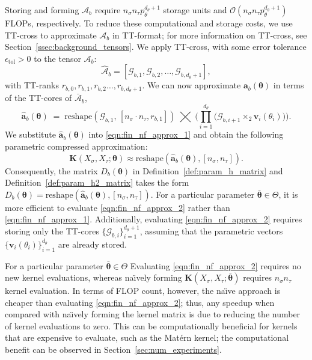 \documentclass[final,3p,times]{elsarticle}
\newcommand{\mc}[1]{\mathcal{#1}}
\renewcommand{\vec}[1]{\boldsymbol{#1}}
\newcommand{\vech}[1]{\widehat{\boldsymbol{#1}}}
\newcommand{\mat}[1]{\boldsymbol{#1}}
\newcommand{\ten}[1]{\boldsymbol{\mathcal{#1}}}
\newcommand{\tenh}[1]{\widehat{\boldsymbol{\mc{#1}}}}
\begin{document}
Storing and forming $\ten{A}_{b}$ require $n_{\sigma}n_{\tau}p_{\theta}^{d_{\theta}+1}$ storage units and  $\mathcal{O}(n_{\sigma}n_{\tau}p_{\theta}^{d_{\theta}+1})$ FLOPs, respectively.
To reduce these computational and storage costs, we use TT-cross to approximate $\ten{A}_{b}$ in TT-format; for more information on TT-cross, see Section~\ref{ssec:background_tensors}.  We apply TT-cross, with some error tolerance $\epsilon_{\text{tol}} > 0$ to the tensor $\ten{A}_{b}$:
$$\tenh{A}_{b} = [\ten{G}_{b, 1}, \ten{G}_{b, 2}, \dots, \ten{G}_{b, d_\theta + 1}],$$
with TT-ranks $r_{b,0}, r_{b,1}, r_{b,2} \dots, r_{b,d_\theta + 1}$. We can now approximate $\vec{a}_b(\vec{\theta})$ in terms of the TT-cores of $\bar{\ten{A}}_b$,
\[
\vech{a}_b(\vec{\theta})
    \;=\;
    \mathrm{reshape}\!\left(\ten{G}_{b,1},\,[n_\sigma  \cdot n_\tau, r_{b, 1}]\right)
    \;\bigtimes\;
    \biggl(
        \prod_{i=1}^{d_\theta}
        \bigl( \ten{G}_{b,i+1} \times_{2} \vec{v}_{i}(\theta_i) \bigr)
    \biggr).
\]
We  substitute $\vech{a}_b(\vec{\theta})$ into \eqref{eqn:fin_nf_approx_1} and obtain the following parametric compressed approximation:
\begin{equation}\label{eqn:fin_nf_approx_2}
    \mat{K}({X}_{\sigma}, {X}_{\tau};\vec{\theta}) \approx \text{reshape}(\vech{a}_b(\vec{\theta}), [n_{\sigma}, n_{\tau}]).
\end{equation}
Consequently, the matrix $D_{b}(\vec{\theta})$ in Definition~\ref{def:param_h_matrix} and Definition~\ref{def:param_h2_matrix} takes the form $D_{b}(\vec{\theta}) = \text{reshape}(\vech{a}_b(\vec{\theta}), [n_{\sigma}, n_{\tau}])$.
For a particular parameter $\bar{\vec{\theta}} \in \Theta$, it is more efficient to evaluate \eqref{eqn:fin_nf_approx_2} rather than \eqref{eqn:fin_nf_approx_1}. Additionally, evaluating \eqref{eqn:fin_nf_approx_2} requires  storing only the TT-cores $\{ \ten{G}_{b,i}\}_{i=1}^{d_{\theta} + 1}$, assuming that the  parametric vectors $\{\vec{v}_{i}(\theta_i) \}_{i=1}^{d_\theta}$ are already stored.



For a particular parameter $\bar{\vec{\theta}} \in \Theta$ Evaluating  \eqref{eqn:fin_nf_approx_2} requires no new kernel evaluations, whereas  na\"{\i}vely forming $\mat{K}({X}_{\sigma}, {X}_{\tau}; \bar{\vec{\vec{\theta}}})$ requires $n_{\sigma}n_{\tau}$ kernel evaluation. In terms of FLOP count, however, the na\"{\i}ve approach is cheaper than evaluating \eqref{eqn:fin_nf_approx_2}; thus, any speedup when compared with na\"{\i}vely forming the kernel matrix is due to reducing the number of kernel evaluations to zero. This can be computationally beneficial for kernels that are expensive to evaluate, such as the Mat\'ern  kernel; the computational benefit can be observed in Section~\ref{sec:num_experiments}.
\end{document}
